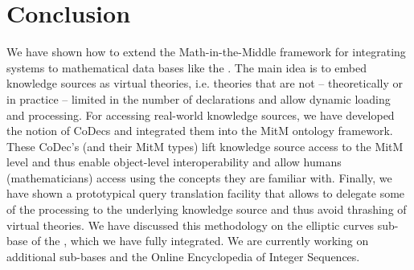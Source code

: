 \section{Conclusion}\label{sec:concl}

We have shown how to extend the Math-in-the-Middle framework for integrating systems to
mathematical data bases like the \lmfdb. The main idea is to embed knowledge sources as
virtual theories, i.e. theories that are not -- theoretically or in practice -- limited in
the number of declarations and allow dynamic loading and processing. For accessing
real-world knowledge sources, we have developed the notion of CoDecs and integrated them
into the MitM ontology framework. These CoDec's (and their MitM types) lift knowledge
source access to the MitM level and thus enable object-level interoperability and allow
humans (mathematicians) access using the concepts they are familiar with. Finally, we have
shown a prototypical query translation facility that allows to delegate some of the
processing to the underlying knowledge source and thus avoid thrashing of virtual
theories. We have discussed this methodology on the elliptic curves sub-base of the
\lmfdb, which we have fully integrated. We are currently working on additional \lmfdb
sub-bases and the Online Encyclopedia of Integer Sequences. 



